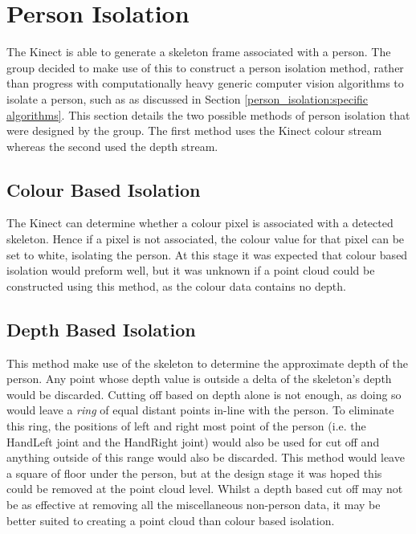 \section{Person Isolation}
\label{design:person isolation}
The Kinect is able to generate a skeleton frame associated with a person.
The group decided to make use of this to construct a person isolation method, rather than progress with computationally heavy generic computer vision algorithms to isolate a person, such as  as discussed in Section \ref{person_isolation:specific algorithms}.
This section details the two possible methods of person isolation that were designed by the group. 
The first method uses the Kinect colour stream whereas the second used the depth stream.\\

\subsection{Colour Based Isolation}
\label{design:colour based isolation}
The Kinect can determine whether a colour pixel is associated with a detected skeleton. 
Hence if a pixel is not associated, the colour value for that pixel can be set to white, isolating the person. 
At this stage it was expected that colour based isolation would preform well, but it was unknown if a point cloud could be constructed using this method, as the colour data contains no depth.\\ 

\subsection{Depth Based Isolation}
\label{design:depth based isolation}
This method make use of the skeleton to determine the approximate depth of the person.
Any point whose depth value is outside a delta of the skeleton's depth would be discarded. 
Cutting off based on depth alone is not enough, as doing so would leave a \textit{ring} of equal distant points in-line with the person. 
To eliminate this ring, the positions of left and right most point of the person (i.e. the HandLeft joint and the HandRight joint) would also be used for cut off and anything outside of this range would also be discarded.
This method would leave a square of floor under the person, but at the design stage it was hoped this could be removed at the point cloud level. Whilst a depth based cut off may not be as effective at removing all the miscellaneous non-person data, it may be better suited to creating a point cloud than colour based isolation.\\ 